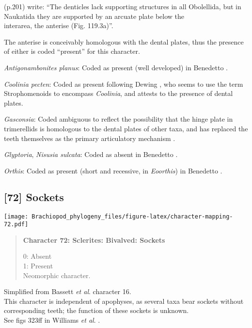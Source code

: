 \documentclass[openany]{book}
\theoremstyle{definition}
\theoremstyle{definition}
\theoremstyle{definition}
\theoremstyle{remark}
\begin{document}
\citet{Williams2000LinguliformeaCraniiformea} (p.201) write: ``The
denticles lack supporting structures in all Obolellida, but in Naukatida
they are supported by an arcuate plate below the\\
interarea, the anterise (Fig. 119.3a)''.

The anterise is conceivably homologous with the dental plates, thus the
presence of either is coded ``present'' for this character.

\hypertarget{Antigonambonites_planus-coding-71}{}
\emph{Antigonambonites planus}: Coded as present (well developed) in
Benedetto \citeyearpar{Benedetto2009iChaniella}.

\hypertarget{Coolinia_pecten-coding-71}{}
\emph{Coolinia pecten}: Coded as present following Dewing
\citeyearpar{Dewing2001Hingemodifications}, who seems to use the term
Strophomenoids to encompass \emph{Coolinia}, and attests to the presence
of dental plates.

\hypertarget{Gasconsia-coding-71}{}
\emph{Gasconsia}: Coded ambiguous to reflect the possibility that the
hinge plate in trimerellids is homologous to the dental plates of other
taxa, and has replaced the teeth themselves as the primary articulatory
mechanism \citep[see][p.~184, for details of the
articulation]{Williams2000LinguliformeaCraniiformea}.

\hypertarget{Glyptoria-coding-71}{}
\emph{Glyptoria}, \emph{Nisusia sulcata}: Coded as absent in Benedetto
\citeyearpar{Benedetto2009iChaniella}.

\hypertarget{Orthis-coding-71}{}
\emph{Orthis}: Coded as present (short and recessive, in
\emph{Eoorthis}) in Benedetto \citeyearpar{Benedetto2009iChaniella}.

\subsection*{{[}72{]} Sockets}\label{sockets}

\texttt{[image: Brachiopod\_phylogeny\_files/figure-latex/character-mapping-72.pdf]}

\begin{quote}
\textbf{Character 72: Sclerites: Bivalved: Sockets}

0: Absent\\
1: Present\\
Neomorphic character.
\end{quote}

Simplified from Bassett \emph{et al}.
\citeyearpar{Bassett2001Functionalmorphology} character 16.\\
This character is independent of apophyses, as several taxa bear sockets
without corresponding teeth; the function of these sockets is unknown.\\
See figs 323ff in Williams \emph{et al}.
\citeyearpar{Williams1997Introduction}.
\end{document}
